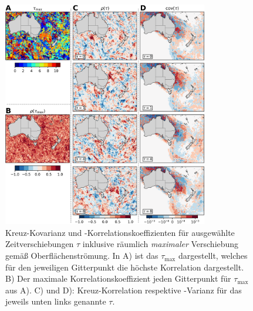 \documentclass[12pt,a4paper,onecolumn]{scrartcl}
\begin{document}
\begin{figure}[!htb]
\centering
\includegraphics[width=0.8\textwidth]{bilder/correlation_selection.png}
\caption{Kreuz-Kovarianz und -Korrelationskoeffizienten für ausgewählte Zeitverschiebungen $\tau$ inklusive räumlich \textit{maximaler} Verschiebung gemäß Oberflächenströmung. In A) ist das $\tau_\text{max}$ dargestellt, welches für den jeweiligen Gitterpunkt die höchste Korrelation dargestellt. B) Der maximale Korrelationskoeffizient jeden Gitterpunkt für $\tau_\text{max}$ aus A). C) und D): Kreuz-Korrelation respektive -Varianz für das jeweils unten links genannte $\tau$.} \label{fig:correlation_selection}
\end{figure}
\end{document}
